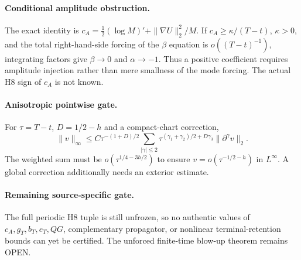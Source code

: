 \paragraph{Conditional amplitude obstruction.}
The exact identity is \(c_A=\frac12(\log M)'+\|\nabla U\|_2^2/M\).
If \(c_A\ge\kappa/(T-t)\), \(\kappa>0\), and the total right-hand-side forcing of the \(\beta\) equation is \(o((T-t)^{-1})\), integrating factors give \(\beta\to0\) and \(\alpha\to-1\). Thus a positive coefficient requires amplitude injection rather than mere smallness of the mode forcing. The actual H8 sign of \(c_A\) is not known.

\paragraph{Anisotropic pointwise gate.}
For \(\tau=T-t\), \(D=1/2-h\) and a compact-chart correction,
\[
\|v\|_\infty\le C\tau^{-(1+D)/2}
\sum_{|\gamma|\le2}\tau^{(\gamma_1+\gamma_2)/2+D\gamma_3}
\|\partial^\gamma v\|_2.
\]
The weighted sum must be \(o(\tau^{1/4-3h/2})\) to ensure \(v=o(\tau^{-1/2-h})\) in \(L^\infty\). A global correction additionally needs an exterior estimate.

\paragraph{Remaining source-specific gate.}
The full periodic H8 tuple is still unfrozen, so no authentic values of \(c_A,g_T,b_T,e_T,QG\), complementary propagator, or nonlinear terminal-retention bounds can yet be certified. The unforced finite-time blow-up theorem remains OPEN.
